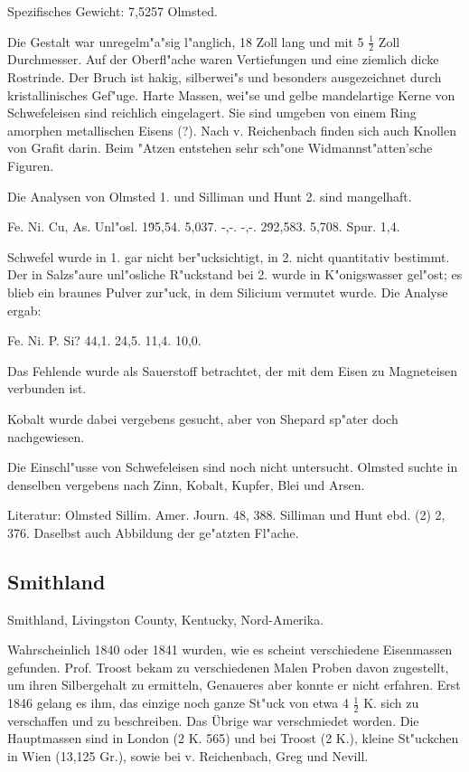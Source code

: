\documentclass[a4paper, 11pt, oneside]{article}
\begin{document}
Spezifisches Gewicht: 7,5257 Olmsted.

Die Gestalt war unregelm"a"sig l"anglich, 18 Zoll lang und mit 5 $\frac{1}{2}$ Zoll Durchmesser. Auf der Oberfl"ache waren Vertiefungen und eine ziemlich dicke Rostrinde. Der Bruch ist hakig, silberwei"s und besonders ausgezeichnet durch kristallinisches Gef"uge. Harte Massen, wei"se und gelbe mandelartige Kerne von Schwefeleisen sind reichlich eingelagert. Sie sind umgeben von einem Ring amorphen metallischen Eisens (?). Nach v. Reichenbach finden sich auch Knollen von Grafit darin. Beim "Atzen entstehen sehr sch"one Widmannst"atten'sche Figuren.

Die Analysen von Olmsted 1. und Silliman und Hunt 2. sind mangelhaft.

Fe. Ni. Cu, As. Unl"osl.  
1\. 95,54. 5,037. -,-. -,-.  
2\. 92,583. 5,708. Spur. 1,4.

Schwefel wurde in 1. gar nicht ber"ucksichtigt, in 2. nicht quantitativ bestimmt. Der in Salzs"aure unl"osliche R"uckstand bei 2. wurde in K"onigswasser gel"ost; es blieb ein braunes Pulver zur"uck, in dem Silicium vermutet wurde. Die Analyse ergab:

Fe. Ni. P. Si?  
44,1. 24,5. 11,4. 10,0.

Das Fehlende wurde als Sauerstoff betrachtet, der mit dem Eisen zu Magneteisen verbunden ist.

Kobalt wurde dabei vergebens gesucht, aber von Shepard sp"ater doch nachgewiesen.

Die Einschl"usse von Schwefeleisen sind noch nicht untersucht. Olmsted suchte in denselben vergebens nach Zinn, Kobalt, Kupfer, Blei und Arsen.

Literatur: Olmsted Sillim. Amer. Journ. 48, 388. Silliman und Hunt ebd. (2) 2, 376. Daselbst auch Abbildung der ge"atzten Fl"ache.

\subsection{Smithland}

Smithland, Livingston County, Kentucky, Nord-Amerika.

Wahrscheinlich 1840 oder 1841 wurden, wie es scheint verschiedene Eisenmassen gefunden. Prof. Troost bekam zu verschiedenen Malen Proben davon zugestellt, um ihren Silbergehalt zu ermitteln, Genaueres aber konnte er nicht erfahren. Erst 1846 gelang es ihm, das einzige noch ganze St"uck von etwa 4 $\frac{1}{2}$ K. sich zu verschaffen und zu beschreiben. Das Übrige war verschmiedet worden. Die Hauptmassen sind in London (2 K. 565) und bei Troost (2 K.), kleine St"uckchen in Wien (13,125 Gr.), sowie bei v. Reichenbach, Greg und Nevill.
\end{document}
